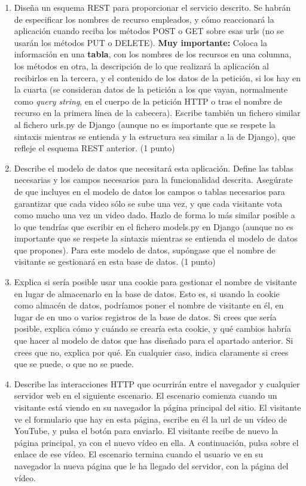 \begin{enumerate}
\item Diseña un esquema REST para proporcionar el servicio descrito. Se habrán de especificar los nombres de recurso empleados, y cómo reaccionará la aplicación cuando reciba los métodos POST o GET sobre esas urls (no se usarán los métodos PUT o DELETE). \textbf{Muy importante:} Coloca la información en una \textbf{tabla}, con los nombres de los recursos en una columna, los métodos en otra, la descripción de lo que realizará la aplicación al recibirlos en la tercera, y el contenido de los datos de la petición, si los hay en la cuarta (se consideran datos de la petición a los que vayan, normalmente como \emph{query string}, en el cuerpo de la petición HTTP o tras el nombre de recurso en la primera línea de la cabecera). Escribe también un fichero similar al fichero urls.py de Django (aunque no es importante que se respete la sintaxis mientras se entienda y la estructura sea similar a la de Django), que refleje el esquema REST anterior. (1 punto)

\item Describe el modelo de datos que necesitará esta aplicación. Define las tablas necesarias y los campos necesarios para la funcionalidad descrita. Asegúrate de que incluyes en el modelo de datos los campos o tablas necesarios para garantizar que cada video sólo se sube una vez, y que cada visitante vota como mucho una vez un video dado. Hazlo de forma lo más similar posible a lo que tendrías que escribir en el fichero models.py en Django (aunque no es importante que se respete la sintaxis mientras se entienda el modelo de datos que propones). Para este modelo de datos, supóngase que el nombre de visitante se gestionará en esta base de datos. (1 punto)

\item Explica si sería posible usar una cookie para gestionar el nombre de visitante en lugar de almacenarlo en la base de datos. Esto es, si usando la cookie como almacén de datos, podríamos poner el nombre de visitante en él, en lugar de en uno o varios registros de la base de datos. Si crees que sería posible, explica cómo y cuándo se crearía esta cookie, y qué cambios habría que hacer al modelo de datos que has diseñado para el apartado anterior. Si crees que no, explica por qué. En cualquier caso, indica claramente si crees que se puede, o que no se puede.
  
\item Describe las interacciones HTTP que ocurrirán entre el navegador y cualquier servidor web en el siguiente escenario. El escenario comienza cuando un visitante está viendo en su navegador la página principal del sitio. El visitante ve el formulario que hay en esta página, escribe en él la url de un vídeo de YouTube, y pulsa el botón para enviarlo. El visitante recibe de nuevo la página principal, ya con el nuevo vídeo en ella. A continuación, pulsa sobre el enlace de ese vídeo. El escenario termina cuando el usuario ve en su navegador la nueva página que le ha llegado del servidor, con la página del vídeo.


\end{enumerate}
